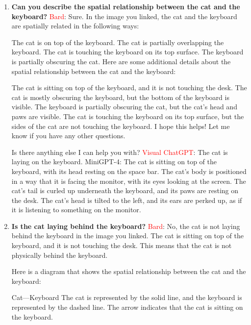     \begin{enumerate}
        \item \textbf{Can you describe the spatial relationship between the cat and the keyboard?}
        \subitem \textcolor{Red}{Bard}: 
        Sure. In the image you linked, the cat and the keyboard are spatially related in the following ways:
        
        The cat is on top of the keyboard.
        The cat is partially overlapping the keyboard.
        The cat is touching the keyboard on its top surface.
        The keyboard is partially obscuring the cat.
        Here are some additional details about the spatial relationship between the cat and the keyboard:
        
        The cat is sitting on top of the keyboard, and it is not touching the desk.
        The cat is mostly obscuring the keyboard, but the bottom of the keyboard is visible.
        The keyboard is partially obscuring the cat, but the cat's head and paws are visible.
        The cat is touching the keyboard on its top surface, but the sides of the cat are not touching the keyboard.
        I hope this helps! Let me know if you have any other questions.
        
        Is there anything else I can help you with?
        \subitem \textcolor{red}{Visual ChatGPT}: The cat is laying on the keyboard.
        \subitem MiniGPT-4: The cat is sitting on top of the keyboard, with its head resting on the space bar. The cat’s body is positioned in a way that it is facing the monitor, with its eyes looking at the screen. The cat’s tail is curled up underneath the keyboard, and its paws are resting on the desk. The cat’s head is tilted to the left, and its ears are perked up, as if it is listening to something on the monitor.
        \item \textbf{Is the cat laying behind the keyboard?}
        \subitem \textcolor{Red}{Bard}: 
        No, the cat is not laying behind the keyboard in the image you linked. The cat is sitting on top of the keyboard, and it is not touching the desk. This means that the cat is not physically behind the keyboard.
        
        Here is a diagram that shows the spatial relationship between the cat and the keyboard:
        
        Cat---Keyboard
        The cat is represented by the solid line, and the keyboard is represented by the dashed line. The arrow indicates that the cat is sitting on the keyboard.
        

\end{enumerate}
